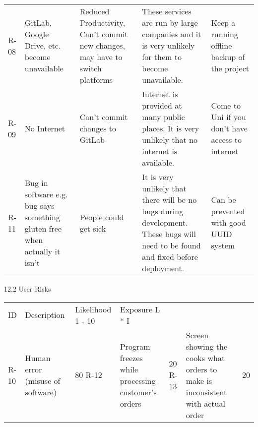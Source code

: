 \begin{tabularx}{\linewidth}{|X|X|X|X|X|}
    R-08 & GitLab, Google Drive, etc. become unavailable & Reduced Productivity, Can’t commit new changes, may have to switch platforms & These services are run by large companies and it is very unlikely for them to become unavailable. & Keep a running offline backup of the project \\
    R-09 & No Internet & Can’t commit changes to GitLab & Internet is provided at many public places. It is very unlikely that no internet is available. & Come to Uni if you don’t have access to internet \\
    R-11 & Bug in software e.g. bug says something gluten free when actually it isn’t & People could get sick & It is very unlikely that there will be no bugs during development. These bugs will need to be found and fixed before deployment. & Can be prevented with good UUID system \\
\end{tabularx}





12.2 User Risks

\begin{tabularx}{\linewidth}{|X|X|X|X|X|}
    ID & Description & Likelihood
    1 - 10 & Exposure
    L * I \\
    R-10 & Human error (misuse of software) & 80%
    R-12 & Program freezes while processing customer’s orders & 20%
    R-13 & Screen showing the cooks what orders to make is inconsistent with actual order & 20%
\end{tabularx}


